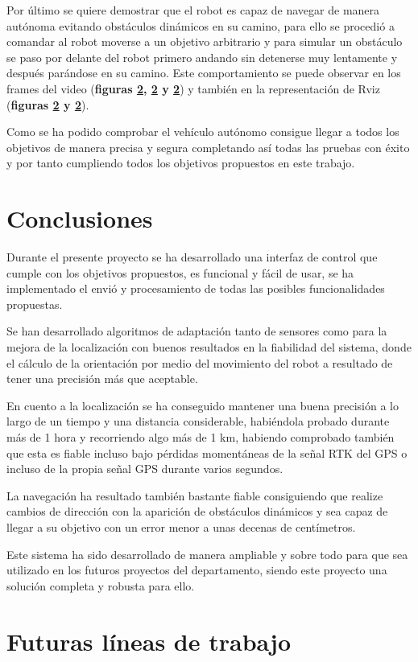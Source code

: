 Por último se quiere demostrar que el robot es capaz de navegar de manera autónoma evitando obstáculos dinámicos en su camino, para ello se procedió a comandar al robot moverse 
a un objetivo arbitrario y para simular un obstáculo se paso por delante del robot primero andando sin detenerse muy lentamente y después parándose en su camino.
Este comportamiento se puede observar en los frames del video (\textbf{figuras \ref{}, \ref{} y \ref{}}) y también en la representación de Rviz (\textbf{figuras \ref{} y \ref{}}).


Como se ha podido comprobar el vehículo autónomo consigue llegar a todos los objetivos de manera precisa y segura completando así todas las pruebas con éxito y por tanto 
cumpliendo todos los objetivos propuestos en este trabajo.
 
\chapter{Conclusiones}
Durante el presente proyecto se ha desarrollado una interfaz de control que cumple con los objetivos propuestos, es funcional y fácil de usar, 
se ha implementado el envió y procesamiento de todas las posibles funcionalidades propuestas.

Se han desarrollado algoritmos de adaptación tanto de sensores como para la mejora de la localización con buenos resultados en la fiabilidad del sistema, donde el cálculo 
de la orientación por medio del movimiento del robot a resultado de tener una precisión más que aceptable.

En cuento a la localización se ha conseguido mantener una buena precisión a lo largo de un tiempo y una distancia considerable, habiéndola probado durante más de 1 hora 
y recorriendo algo más de 1 km, habiendo comprobado también
que esta es fiable incluso bajo pérdidas momentáneas de la señal RTK del GPS o incluso de la propia señal GPS durante varios segundos.

La navegación ha resultado también bastante fiable consiguiendo que realize cambios de dirección con la aparición de obstáculos dinámicos y sea capaz de 
llegar a su objetivo con un error menor a unas decenas de centímetros.

Este sistema ha sido desarrollado de manera ampliable y sobre todo para que sea utilizado en los futuros proyectos del departamento, 
siendo este proyecto una solución completa y robusta para ello.

\chapter{Futuras líneas de trabajo}

